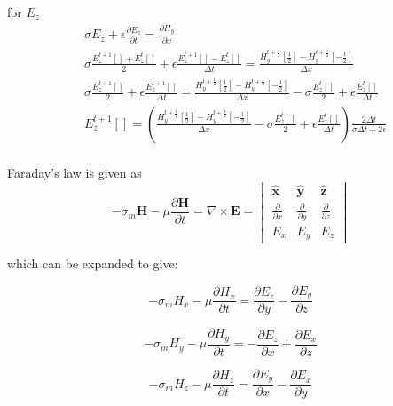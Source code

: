 for $E_{z}$
\begin{equation}
\begin{split}
&\sigma  E_{z} + \epsilon \frac{\partial  E_{z}}{\partial t} = \frac{\partial  H_{y}}{\partial x}\\
&\sigma  \frac{E_{z}^{t+1}[]+E_{z}^{t}[]}{2} + \epsilon \frac{E_{z}^{t+1}[]-E_{z}^{t}[]}{\Delta t} = \frac{H_{y}^{t+\frac{1}{2}}[\frac{1}{2}]-H_{y}^{t+\frac{1}{2}}[-\frac{1}{2}]}{\Delta x}\\
&\sigma  \frac{E_{z}^{t+1}[]}{2} + \epsilon \frac{E_{z}^{t+1}[]}{\Delta t} = \frac{H_{y}^{t+\frac{1}{2}}[\frac{1}{2}]-H_{y}^{t+\frac{1}{2}}[-\frac{1}{2}]}{\Delta x}-\sigma  \frac{E_{z}^{t}[]}{2} + \epsilon \frac{E_{z}^{t}[]}{\Delta t}\\
&E_{z}^{t+1}[]= \left ( \frac{H_{y}^{t+\frac{1}{2}}[\frac{1}{2}]-H_{y}^{t+\frac{1}{2}}[-\frac{1}{2}]}{\Delta x}-\sigma  \frac{E_{z}^{t}[]}{2} + \epsilon \frac{E_{z}^{t}[]}{\Delta t} \right ) \frac{2 \Delta t}{\sigma \Delta t  + 2 \epsilon}\\
\end{split}
\end{equation}

Faraday's law is given as \cite{FDTD_Schneider}
\begin{equation}
-\sigma_{m}  \boldsymbol{H} - \mu \frac{\partial  \boldsymbol{H}}{\partial t} = \nabla \times \boldsymbol{E} =
\begin{vmatrix} \hat{\boldsymbol{x}} & \hat{\boldsymbol{y}} & \hat{\boldsymbol{z}} \\ 
\frac{\partial}{\partial x} & \frac{\partial}{\partial y} & \frac{\partial}{\partial z} \\ 
E_{x} & E_{y} & E_{z}
\end{vmatrix}
\end{equation}

which can be expanded to give:

\begin{equation}
-\sigma_{m}  H_{x} - \mu \frac{\partial  H_{x}}{\partial t} = \frac{\partial  E_{z}}{\partial y}-\frac{\partial  E_{y}}{\partial z}
\end{equation}

\begin{equation}
-\sigma_{m}  H_{y} - \mu \frac{\partial  H_{y}}{\partial t} = -\frac{\partial  E_{z}}{\partial x}+\frac{\partial  E_{x}}{\partial z}
\end{equation}

\begin{equation}
-\sigma_{m}  H_{z} - \mu \frac{\partial  H_{z}}{\partial t} = \frac{\partial  E_{y}}{\partial x}-\frac{\partial  E_{x}}{\partial y}
\end{equation}

